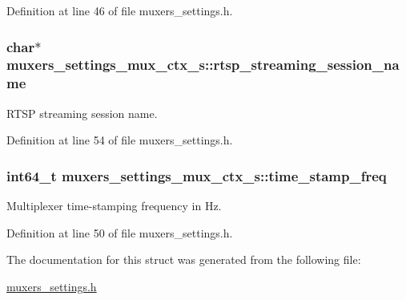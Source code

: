 Definition at line 46 of file muxers\+\_\+settings.\+h.

\subsubsection[{\texorpdfstring{rtsp\+\_\+streaming\+\_\+session\+\_\+name}{rtsp_streaming_session_name}}]{\setlength{\rightskip}{0pt plus 5cm}char$\ast$ muxers\+\_\+settings\+\_\+mux\+\_\+ctx\+\_\+s\+::rtsp\+\_\+streaming\+\_\+session\+\_\+name}\hypertarget{structmuxers__settings__mux__ctx__s_ac4ef81d53ff9aa0acdd50a65a644c5dc}{}\label{structmuxers__settings__mux__ctx__s_ac4ef81d53ff9aa0acdd50a65a644c5dc}
R\+T\+SP streaming session name. 

Definition at line 54 of file muxers\+\_\+settings.\+h.

\subsubsection[{\texorpdfstring{time\+\_\+stamp\+\_\+freq}{time_stamp_freq}}]{\setlength{\rightskip}{0pt plus 5cm}int64\+\_\+t muxers\+\_\+settings\+\_\+mux\+\_\+ctx\+\_\+s\+::time\+\_\+stamp\+\_\+freq}\hypertarget{structmuxers__settings__mux__ctx__s_a1f6ddfa73781bf1a451982dd7cc5cc36}{}\label{structmuxers__settings__mux__ctx__s_a1f6ddfa73781bf1a451982dd7cc5cc36}
Multiplexer time-\/stamping frequency in Hz. 

Definition at line 50 of file muxers\+\_\+settings.\+h.



The documentation for this struct was generated from the following file\+:\begin{DoxyCompactItemize}
\item 
\hyperlink{muxers__settings_8h}{muxers\+\_\+settings.\+h}\end{DoxyCompactItemize}
